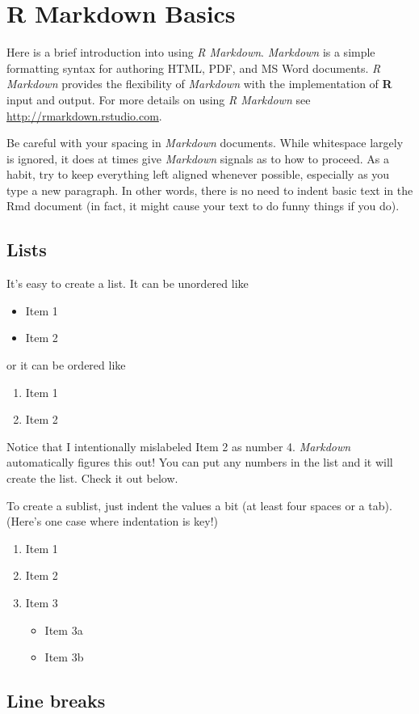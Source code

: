 \documentclass[12pt,twoside]{reedthesis}
\providecommand{\tightlist}{%
  \setlength{\itemsep}{0pt}\setlength{\parskip}{0pt}}
\theoremstyle{definition}
\theoremstyle{definition}
\theoremstyle{definition}
\theoremstyle{remark}
\begin{document}
\hypertarget{rmd-basics}{%
\chapter{R Markdown Basics}\label{rmd-basics}}

Here is a brief introduction into using \emph{R Markdown}.
\emph{Markdown} is a simple formatting syntax for authoring HTML, PDF,
and MS Word documents. \emph{R Markdown} provides the flexibility of
\emph{Markdown} with the implementation of \textbf{R} input and output.
For more details on using \emph{R Markdown} see
\url{http://rmarkdown.rstudio.com}.

Be careful with your spacing in \emph{Markdown} documents. While
whitespace largely is ignored, it does at times give \emph{Markdown}
signals as to how to proceed. As a habit, try to keep everything left
aligned whenever possible, especially as you type a new paragraph. In
other words, there is no need to indent basic text in the Rmd document
(in fact, it might cause your text to do funny things if you do).

\hypertarget{lists}{%
\section{Lists}\label{lists}}

It's easy to create a list. It can be unordered like
\begin{itemize}
\tightlist
\item
  Item 1
\item
  Item 2
\end{itemize}
or it can be ordered like
\begin{enumerate}
\def\labelenumi{\arabic{enumi}.}
\tightlist
\item
  Item 1
\item
  Item 2
\end{enumerate}
Notice that I intentionally mislabeled Item 2 as number 4.
\emph{Markdown} automatically figures this out! You can put any numbers
in the list and it will create the list. Check it out below.

To create a sublist, just indent the values a bit (at least four spaces
or a tab). (Here's one case where indentation is key!)
\begin{enumerate}
\def\labelenumi{\arabic{enumi}.}
\tightlist
\item
  Item 1
\item
  Item 2
\item
  Item 3
  \begin{itemize}
  \tightlist
  \item
    Item 3a
  \item
    Item 3b
  \end{itemize}
\end{enumerate}
\hypertarget{line-breaks}{%
\section{Line breaks}\label{line-breaks}}
\end{document}
